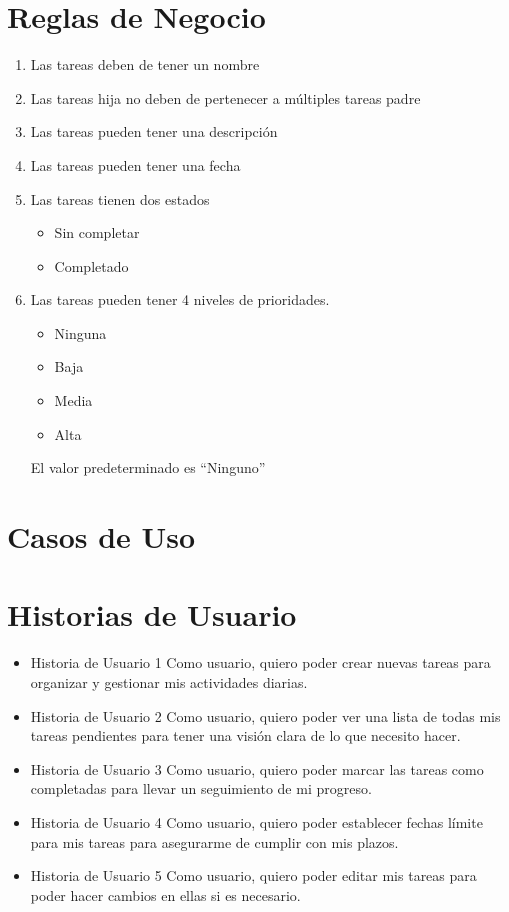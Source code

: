 \section{Reglas de Negocio}
\begin{enumerate}[start=1, label={RN\arabic*.}]
  \item Las tareas deben de tener un nombre \label{rn:nombre}
  \item Las tareas hija no deben de pertenecer a m\'ultiples tareas padre \label{rn:thija}
  \item Las tareas pueden tener una descripci\'on \label{rn:desc}
  \item Las tareas pueden tener una fecha \label{rn:fecha}
  \item Las tareas tienen dos estados \label{rn:estado}
    \begin{itemize}
      \item Sin completar
      \item Completado
    \end{itemize}
  \item Las tareas pueden tener 4 niveles de prioridades. \label{rn:prioridad}
    \begin{itemize}
      \item Ninguna
      \item Baja
      \item Media
      \item Alta
    \end{itemize}
    El valor predeterminado es ``Ninguno''
\end{enumerate}
	\section{Casos de Uso}
	 
    
    \section{Historias de Usuario}
    \begin{itemize}
        \item Historia de Usuario 1
        Como usuario, quiero poder crear nuevas tareas para organizar y gestionar mis actividades diarias.
        
        \item Historia de Usuario 2
        Como usuario, quiero poder ver una lista de todas mis tareas pendientes para tener una visión clara de lo que necesito hacer.
        
        \item Historia de Usuario 3
        Como usuario, quiero poder marcar las tareas como completadas para llevar un seguimiento de mi progreso.
        
        \item Historia de Usuario 4
        Como usuario, quiero poder establecer fechas límite para mis tareas para asegurarme de cumplir con mis plazos.

        \item Historia de Usuario 5
        Como usuario, quiero poder editar mis tareas para poder hacer cambios en ellas si es necesario.
    \end{itemize}
